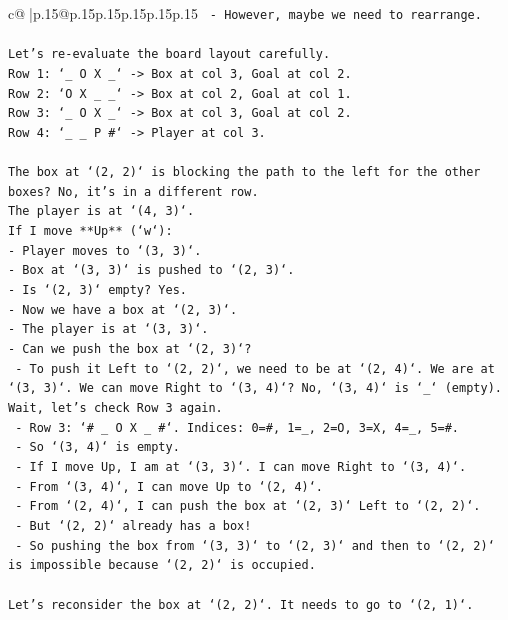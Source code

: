 \documentclass{article}
\begin{document}
{\begin{supertabular}{c@{$\;$}|p{.15\linewidth}@{}p{.15\linewidth}p{.15\linewidth}p{.15\linewidth}p{.15\linewidth}p{.15\linewidth}}
{{{\texttt{  {-} However, maybe we need to rearrange.} \\
\\ 
\texttt{Let's re{-}evaluate the board layout carefully.} \\
\texttt{Row 1: `\_ O X \_` {-}> Box at col 3, Goal at col 2.} \\
\texttt{Row 2: `O X \_ \_` {-}> Box at col 2, Goal at col 1.} \\
\texttt{Row 3: `\_ O X \_` {-}> Box at col 3, Goal at col 2.} \\
\texttt{Row 4: `\_ \_ P \#` {-}> Player at col 3.} \\
\\ 
\texttt{The box at `(2, 2)` is blocking the path to the left for the other boxes? No, it's in a different row.} \\
\texttt{The player is at `(4, 3)`.} \\
\texttt{If I move **Up** (`w`):} \\
\texttt{{-} Player moves to `(3, 3)`.} \\
\texttt{{-} Box at `(3, 3)` is pushed to `(2, 3)`.} \\
\texttt{{-} Is `(2, 3)` empty? Yes.} \\
\texttt{{-} Now we have a box at `(2, 3)`.} \\
\texttt{{-} The player is at `(3, 3)`.} \\
\texttt{{-} Can we push the box at `(2, 3)`?} \\
\texttt{  {-} To push it Left to `(2, 2)`, we need to be at `(2, 4)`. We are at `(3, 3)`. We can move Right to `(3, 4)`? No, `(3, 4)` is `\_` (empty). Wait, let's check Row 3 again.} \\
\texttt{  {-} Row 3: `\# \_ O X \_ \#`. Indices: 0=\#, 1=\_, 2=O, 3=X, 4=\_, 5=\#.} \\
\texttt{  {-} So `(3, 4)` is empty.} \\
\texttt{  {-} If I move Up, I am at `(3, 3)`. I can move Right to `(3, 4)`.} \\
\texttt{  {-} From `(3, 4)`, I can move Up to `(2, 4)`.} \\
\texttt{  {-} From `(2, 4)`, I can push the box at `(2, 3)` Left to `(2, 2)`.} \\
\texttt{  {-} But `(2, 2)` already has a box!} \\
\texttt{  {-} So pushing the box from `(3, 3)` to `(2, 3)` and then to `(2, 2)` is impossible because `(2, 2)` is occupied.} \\
\\ 
\texttt{Let's reconsider the box at `(2, 2)`. It needs to go to `(2, 1)`.} \\
}}}
\end{supertabular}}
\end{document}
